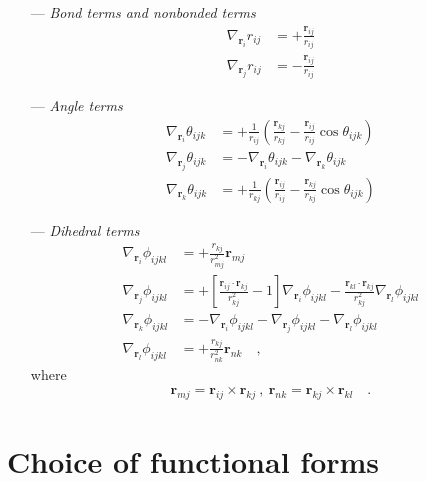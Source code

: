 \documentclass[10pt,a4paper]{report}
\numberwithin{equation}{section}
\newcommand{\rsub}[1]{\mathbf{r}_{#1}}
\begin{document}
\begin{itemize}
  \item [---]\textit{Bond terms and nonbonded terms}
  \begin{align}
  \label{eq:distance-gradient}
  \nabla_{\mathbf{r}_i}r_{ij} & = +\frac{\mathbf{r}_{ij}}{r_{ij}} \\ \nonumber
  \nabla_{\mathbf{r}_j}r_{ij} & = -\frac{\mathbf{r}_{ij}}{r_{ij}}
  \end{align}
  \item[---]\textit{Angle terms}
\begin{align}
  \label{eq:angle-gradient}
  \nabla_{\mathbf{r}_i}\theta_{ijk} & = +\frac{1}{r_{ij}}\left( \frac{\rsub{kj}}{r_{kj}} - \frac{\rsub{ij}}{r_{ij}} \cos \theta_{ijk} \right) \\ \nonumber
  \nabla_{\mathbf{r}_j}\theta_{ijk} & = -\nabla_{\mathbf{r}_i}\theta_{ijk}-\nabla_{\mathbf{r}_k}\theta_{ijk} \\ \nonumber
  \nabla_{\mathbf{r}_k}\theta_{ijk} & = +\frac{1}{r_{kj}}\left( \frac{\rsub{ij}}{r_{ij}} - \frac{\rsub{kj}}{r_{kj}} \cos \theta_{ijk} \right)
\end{align}
\item [---]\textit{Dihedral terms}
  \begin{align}
    \label{eq:dihedral-gradient}
    \nabla_{\mathbf{r}_i}\phi_{ijkl} & = +\frac{r_{kj}}{r_{mj}^2}\rsub{mj} \\ \nonumber
    \nabla_{\mathbf{r}_j}\phi_{ijkl} & = +\left[\frac{\rsub{ij}\cdot\rsub{kj}}{r_{kj}^2}- 1\right]\nabla_{\rsub{i}}\phi_{ijkl} - \frac{\rsub{kl}\cdot\rsub{kj}}{r_{kj}^2}\nabla_{\rsub{l}}\phi_{ijkl}\\ \nonumber
    \nabla_{\mathbf{r}_k}\phi_{ijkl} & = -\nabla_{\rsub{i}}\phi_{ijkl} - \nabla_{\rsub{j}}\phi_{ijkl} - \nabla_{\rsub{l}}\phi_{ijkl}\\ \nonumber
    \nabla_{\mathbf{r}_l}\phi_{ijkl} & = +\frac{r_{kj}}{r_{nk}^2}\rsub{nk}  \quad ,
  \end{align}
  where
  \begin{align*}
    \rsub{mj} = \rsub{ij}\times\rsub{kj}\ ,\ \rsub{nk} = \rsub{kj}\times\rsub{kl}\quad .
  \end{align*}
\end{itemize}

\section{Choice of functional forms}
\label{sec:choice-of-functional-forms}
\end{document}
